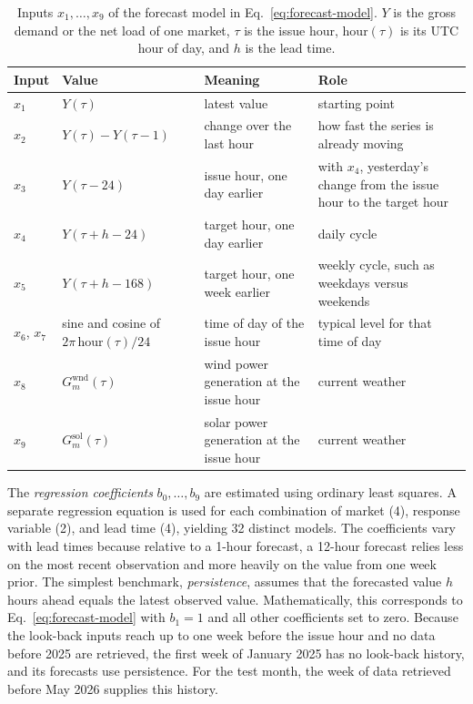\documentclass{UNCC-thesis}
\begin{document}
\begin{table}[htbp]
  \centering
  \footnotesize
  \caption[Inputs of the forecast model]{Inputs \(x_1,\dots,x_9\) of the forecast model in
  Eq.~\eqref{eq:forecast-model}. \(Y\) is the gross demand or the net
  load of one market, \(\tau\) is the issue hour, \(\mathrm{hour}(\tau)\) is its UTC
  hour of day, and \(h\) is the lead time.}
  \label{tab:forecast-inputs}
  \begin{tabular}{@{}L{0.07\columnwidth}L{0.23\columnwidth}L{0.27\columnwidth}L{0.33\columnwidth}@{}}
    \toprule
    Input & Value & Meaning & Role \\
    \midrule
    \(x_1\) & \(Y(\tau)\)
      & latest value
      & starting point \\
    \addlinespace
    \(x_2\) & \(Y(\tau)-Y(\tau-1)\)
      & change over the last hour
      & how fast the series is already moving \\
    \addlinespace
    \(x_3\) & \(Y(\tau-24)\)
      & issue hour, one day earlier
      & with \(x_4\), yesterday's change from the issue hour to the
        target hour \\
    \addlinespace
    \(x_4\) & \(Y(\tau+h-24)\)
      & target hour, one day earlier
      & daily cycle \\
    \addlinespace
    \(x_5\) & \(Y(\tau+h-168)\)
      & target hour, one week earlier
      & weekly cycle, such as weekdays versus weekends \\
    \addlinespace
    \(x_6\), \(x_7\) & sine and cosine of \(2\pi\,\mathrm{hour}(\tau)/24\)
      & time of day of the issue hour
      & typical level for that time of day \\
    \addlinespace
    \(x_8\) & \(G^{\mathrm{wnd}}_m(\tau)\)
      & wind power generation at the issue hour
      & current weather \\
    \addlinespace
    \(x_9\) & \(G^{\mathrm{sol}}_m(\tau)\)
            & solar power generation at the issue hour
      & current weather \\
    \bottomrule
  \end{tabular}
\end{table}

The \emph{regression coefficients} \(b_0,\dots,b_9\) are estimated using ordinary
least squares. A separate regression equation is used for each combination of
market (4), response variable (2), and lead time (4), yielding 32 distinct
models. The coefficients vary with lead times because relative to a 1-hour
forecast, a 12-hour forecast relies less on the most recent observation and more
heavily on the value from one week prior. The simplest benchmark,
\emph{persistence}, assumes that the forecasted value \(h\) hours ahead equals
the latest observed value. Mathematically, this corresponds to
Eq.~\eqref{eq:forecast-model} with \(b_1=1\) and all other coefficients set
to zero. Because the look-back inputs reach up to one week before the issue hour and no data
before 2025 are retrieved, the first week of January 2025 has no look-back history, and its
forecasts use persistence. For the test month, the week of data retrieved before May 2026
supplies this history.
\end{document}
